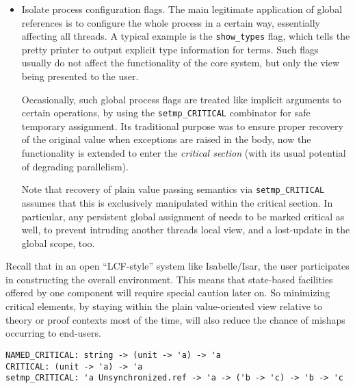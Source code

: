 \begin{isabellebody}
\begin{isamarkuptext}
\begin{itemize}
  \item Isolate process configuration flags.  The main legitimate
  application of global references is to configure the whole process
  in a certain way, essentially affecting all threads.  A typical
  example is the \verb|show_types| flag, which tells the pretty printer
  to output explicit type information for terms.  Such flags usually
  do not affect the functionality of the core system, but only the
  view being presented to the user.

  Occasionally, such global process flags are treated like implicit
  arguments to certain operations, by using the \verb|setmp_CRITICAL| combinator
  for safe temporary assignment.  Its traditional purpose was to
  ensure proper recovery of the original value when exceptions are
  raised in the body, now the functionality is extended to enter the
  \emph{critical section} (with its usual potential of degrading
  parallelism).

  Note that recovery of plain value passing semantics via \verb|setmp_CRITICAL|~ assumes that this  is
  exclusively manipulated within the critical section.  In particular,
  any persistent global assignment of  needs to
  be marked critical as well, to prevent intruding another threads
  local view, and a lost-update in the global scope, too.

  \end{itemize}

  Recall that in an open ``LCF-style'' system like Isabelle/Isar, the
  user participates in constructing the overall environment.  This
  means that state-based facilities offered by one component will
  require special caution later on.  So minimizing critical elements,
  by staying within the plain value-oriented view relative to theory
  or proof contexts most of the time, will also reduce the chance of
  mishaps occurring to end-users.%
\end{isamarkuptext}%
\isamarkuptrue%
%
\isadelimmlref
%
\endisadelimmlref
%
\isatagmlref
%
\begin{isamarkuptext}%
\begin{mldecls}
  \verb|NAMED_CRITICAL: string -> (unit -> 'a) -> 'a| \\
  \verb|CRITICAL: (unit -> 'a) -> 'a| \\
  \verb|setmp_CRITICAL: 'a Unsynchronized.ref -> 'a -> ('b -> 'c) -> 'b -> 'c| \\
  \end{mldecls}


\end{isamarkuptext}
\end{isabellebody}
